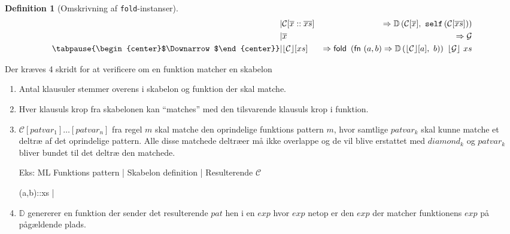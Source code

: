 \documentclass[oneside]{memoir}
\newcommand{\floor}[1]{\ensuremath{\lfloor #1 \rfloor}}
\theoremstyle{definition}
\newtheorem{definition}{Definition}
\begin{document}
\begin{definition}[Omskrivning af \texttt{fold}-instanser] \ \\

  \begin{eqnarray*}[rqrl]
    | & \mathcal{C}[\overline{x} :: \overline{xs}] &  => \mathbb{D} \left( \mathcal{C}
      [\overline{x}],\ \mathtt{self} \left( \mathcal{C}[\overline{xs}] \right) \right) \\
    | & \overline{x} & => \mathcal{G} \\
    \tabpause{\begin{center}$\Downarrow$\end{center}}  
    | & \floor{\mathcal{C}} [xs] & => \textsf{fold } \left( \textsf{fn } (a,b) =>
      \mathbb{D}\left( \floor{\mathcal{C}}[a],\ b \right) \right) \ \floor{\mathcal{G}} \ xs
  \end{eqnarray*}
  
  
\end{definition}



Der kræves 4 skridt for at verificere om en funktion matcher en skabelon

\begin{enumerate}
\item Antal klausuler stemmer overens i skabelon og funktion der skal matche.

\item Hver klausuls krop fra skabelonen kan ``matches'' med den tilsvarende
  klausuls krop i funktion.

\item $\mathcal{C}[patvar_1]\ldots[patvar_n]$ fra regel $m$ skal matche den
  oprindelige funktions pattern $m$, hvor samtlige $patvar_k$ skal kunne matche
  et deltræ af det oprindelige pattern. Alle disse matchede deltræer må ikke
  overlappe og de vil blive erstattet med $diamond_k$ og $patvar_k$ bliver
  bundet til det deltræ den matchede.

  Eks:
  ML Funktions pattern | Skabelon definition | Resulterende $\mathcal{C}$

     (a,b)::xs         | 


\item $\mathbb{D}$ genererer en funktion der sender det resulterende $pat$ hen i
  en $exp$ hvor $exp$ netop er den $exp$ der matcher funktionens $exp$ på
  pågældende plads.

\end{enumerate}
\end{document}

